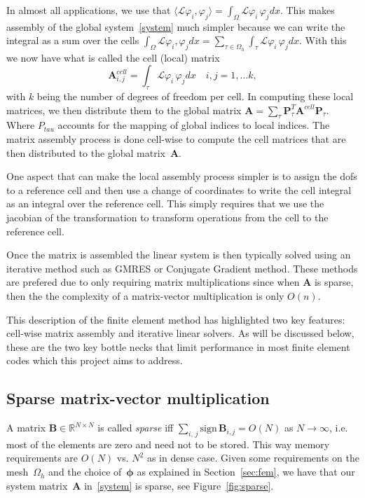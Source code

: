 \documentclass[12pt]{article}
\newcommand{\vect}[1]{\boldsymbol{\mathbf{#1}}}
\newcommand{\dimSize}{N}
\begin{document}
In almost all applications, we use that 
$\langle \mathcal{L}\varphi_{i}, \varphi_{j}\rangle = \int_{\Omega}\mathcal{L}\varphi_{i}\, \varphi_{j}dx $. This makes assembly of the global system~\eqref{system} much simpler because we can write the integral as a sum over the cells $ \int_{\Omega}\mathcal{L}\varphi_{i}, \varphi_{j}dx = \sum_{\tau\in\Omega_h} \int_{\tau}\mathcal{L}\varphi_{i}\, \varphi_{j}dx $. With this we now have what is called the cell (local) matrix 
$$ 
	\mathbf{A}^{cell}_{i,j} = \int_{\tau}\mathcal{L}\varphi_{i}\, \varphi_{j}dx\quad i, j = 1, \ldots k,
$$ 
with $k$ being the number of degrees of freedom per cell. In computing these local matrices, we then distribute them to the global matrix $ \mathbf{A} = \sum_{\tau}\vect P^{T}_{\tau}\mathbf{A}^{cell}\vect P_{\tau} $. Where $P_{tau}$ accounts for the mapping of global indices to local indices. The matrix assembly process is done cell-wise to compute the cell matrices that are then distributed to the global matrix~$\vect A$. 

One aspect that can make the local assembly process simpler is to assign the dofs to a reference cell and then use a change of coordinates to write the cell integral as an integral over the reference cell. This simply requires that we use the jacobian of the transformation to transform operations from the cell to the reference cell.

Once the matrix is assembled the linear system is then typically solved using an iterative method such as GMRES or Conjugate Gradient method. These methods are prefered due to only requiring matrix multiplications since when $\mathbf{A}$ is sparse, then the the complexity of a matrix-vector multiplication is only $O(n)$. 

This description of the finite element method has highlighted two key features: cell-wise matrix assembly and iterative linear solvers. As will be discussed below, these are the two key bottle necks that limit performance in most finite element codes which this project aims to address.

\subsection{Sparse matrix-vector multiplication}\label{sec:CSR}

A matrix $\vect B \in \mathbb R^{\dimSize\times\dimSize}$ is called \textit{sparse} iff $\sum_{i,\,j} \mbox{sign}\,\vect B_{i,j} = O(\dimSize)$ as $\dimSize \rightarrow \infty$, i.e. most of the elements are zero and need not to be stored. This way memory requirements are $O(\dimSize)$ vs. $\dimSize^2$ as in dense case. Given some requirements on the mesh~$\Omega_h$ and the choice of~$\vect\phi$ as explained in Section~\ref{sec:fem}, we have that our system matrix~$\vect A$ in~\eqref{system} is sparse, see Figure~\ref{fig:sparse}.
\end{document}
